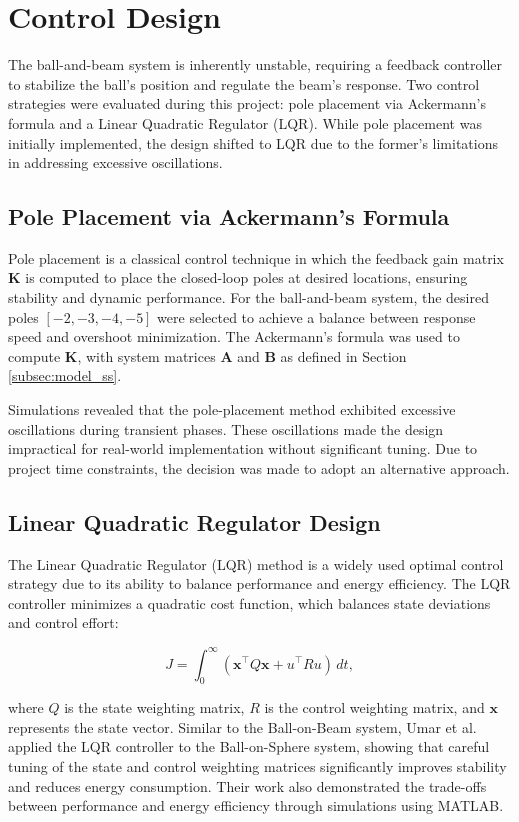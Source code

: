 \documentclass[conference]{IEEEtran}
\begin{document}
\section{Control Design}
\label{sec:control_design}
The ball-and-beam system is inherently unstable, requiring a feedback controller to stabilize the ball's position and regulate the beam's response. Two control strategies were evaluated during this project: pole placement via Ackermann's formula and a Linear Quadratic Regulator (LQR). While pole placement was initially implemented, the design shifted to LQR due to the former's limitations in addressing excessive oscillations.

\subsection{Pole Placement via Ackermann's Formula}
\label{subsec:control_pp_v_acker}
Pole placement is a classical control technique in which the feedback gain matrix \(\mathbf{K}\) is computed to place the closed-loop poles at desired locations, ensuring stability and dynamic performance. For the ball-and-beam system, the desired poles \([-2, -3, -4, -5]\) were selected to achieve a balance between response speed and overshoot minimization. The Ackermann's formula was used to compute \(\mathbf{K}\), with system matrices \(\mathbf{A}\) and \(\mathbf{B}\) as defined in Section \ref{subsec:model_ss}.

Simulations revealed that the pole-placement method exhibited excessive oscillations during transient phases. These oscillations made the design impractical for real-world implementation without significant tuning. Due to project time constraints, the decision was made to adopt an alternative approach.

\subsection{Linear Quadratic Regulator Design}
\label{subsec:lqr_design}
The Linear Quadratic Regulator (LQR) method is a widely used optimal control strategy due to its ability to balance performance and energy efficiency. The LQR controller minimizes a quadratic cost function, which balances state deviations and control effort:

\begin{equation}
    J = \int_{0}^{\infty} (\mathbf{x}^\top Q \mathbf{x} + u^\top R u) \, dt,
\end{equation}

where \( Q \) is the state weighting matrix, \( R \) is the control weighting matrix, and \( \mathbf{x} \) represents the state vector. Similar to the Ball-on-Beam system, Umar et al. \cite{umar2022} applied the LQR controller to the Ball-on-Sphere system, showing that careful tuning of the state and control weighting matrices significantly improves stability and reduces energy consumption. Their work also demonstrated the trade-offs between performance and energy efficiency through simulations using MATLAB.
\end{document}
